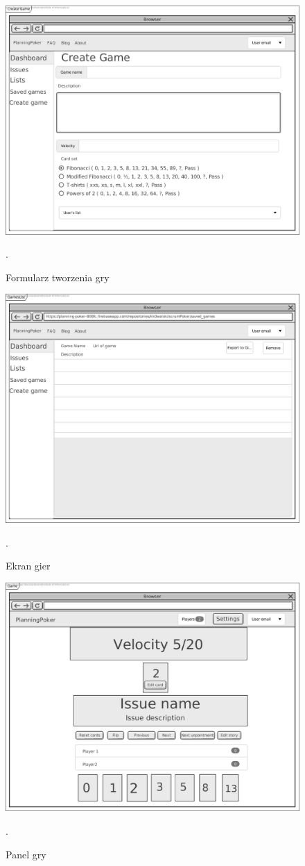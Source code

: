 \begin{figure}[H]
	\centering\includegraphics[width=.7\textwidth]{img/gameCreate}
	\caption{Formularz tworzenia gry}.
	\label{rys:gameCreate}
\end{figure}

\begin{figure}[H]
	\centering\includegraphics[width=.7\textwidth]{img/GamesList}
	\caption{Ekran gier}.
	\label{rys:GamesList}
\end{figure}

\begin{figure}[H]
	\centering\includegraphics[width=.7\textwidth]{img/GameScreen}
	\caption{Panel gry}.
	\label{rys:GameScreen}
\end{figure}

